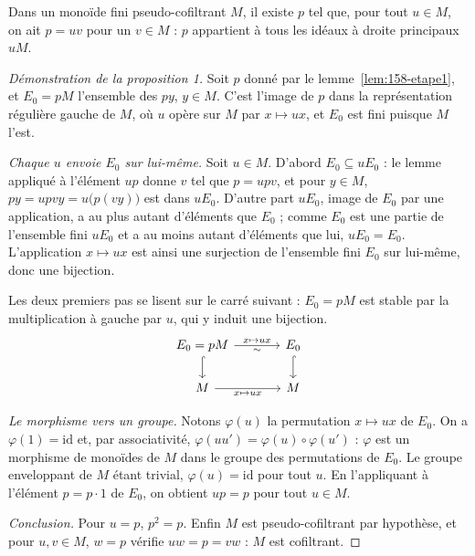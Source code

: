 \begin{lemme}\label{lem:158-etape1}
Dans un monoïde fini pseudo-cofiltrant $M$, il existe $p$ tel que, pour tout $u \in M$, on ait $p = uv$ pour un $v \in M$ : $p$ appartient à tous les idéaux à droite principaux $uM$.
\end{lemme}


\begin{proof}[Démonstration de la proposition 1]
Soit $p$ donné par le lemme~\ref{lem:158-etape1}, et $E_0 = pM$ l'ensemble des $py$, $y \in M$. C'est l'image de $p$ dans la représentation régulière gauche de $M$, où $u$ opère sur $M$ par $x \mapsto ux$, et $E_0$ est fini puisque $M$ l'est.

\emph{Chaque $u$ envoie $E_0$ sur lui-même.} Soit $u \in M$. D'abord $E_0 \subseteq uE_0$ : le lemme appliqué à l'élément $up$ donne $v$ tel que $p = upv$, et pour $y \in M$, $py = upvy = u\bigl(p(vy)\bigr)$ est dans $uE_0$. D'autre part $uE_0$, image de $E_0$ par une application, a au plus autant d'éléments que $E_0$ ; comme $E_0$ est une partie de l'ensemble fini $uE_0$ et a au moins autant d'éléments que lui, $uE_0 = E_0$. L'application $x \mapsto ux$ est ainsi une surjection de l'ensemble fini $E_0$ sur lui-même, donc une bijection.

Les deux premiers pas se lisent sur le carré suivant : $E_0 = pM$ est stable par la multiplication à gauche par $u$, qui y induit une bijection.
\[
\begin{tikzcd}[column sep=large]
E_0 = pM \arrow[r, "x \mapsto ux", "\sim"'] \arrow[d, hook] & E_0 \arrow[d, hook] \\
M \arrow[r, "x \mapsto ux"'] & M
\end{tikzcd}
\]

\emph{Le morphisme vers un groupe.} Notons $\varphi(u)$ la permutation $x \mapsto ux$ de $E_0$. On a $\varphi(1) = \mathrm{id}$ et, par associativité, $\varphi(uu') = \varphi(u) \circ \varphi(u')$ : $\varphi$ est un morphisme de monoïdes de $M$ dans le groupe des permutations de $E_0$. Le groupe enveloppant de $M$ étant trivial, $\varphi(u) = \mathrm{id}$ pour tout $u$. En l'appliquant à l'élément $p = p \cdot 1$ de $E_0$, on obtient $up = p$ pour tout $u \in M$.

\emph{Conclusion.} Pour $u = p$, $p^2 = p$. Enfin $M$ est pseudo-cofiltrant par hypothèse, et pour $u, v \in M$, $w = p$ vérifie $uw = p = vw$ : $M$ est cofiltrant.
\end{proof}

